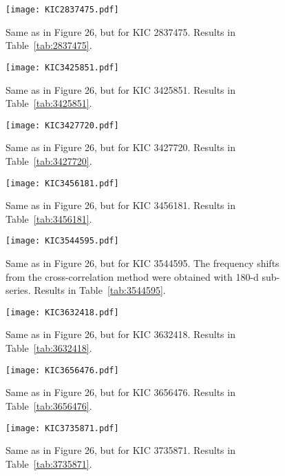 \documentclass[twocolumn]{aastex61}%
\begin{document}
\begin{figure}[ht]
\texttt{[image: KIC2837475.pdf]}
\caption{Same as in Figure 26, but for KIC 2837475. Results in Table~\ref{tab:2837475}.}\label{fig:2837475}
\end{figure}

\begin{figure}[ht]
\texttt{[image: KIC3425851.pdf]}
\caption{Same as in Figure 26, but for KIC 3425851. Results in Table~\ref{tab:3425851}.}\label{fig:3425851}
\end{figure}

\begin{figure}[ht]
\texttt{[image: KIC3427720.pdf]}
\caption{Same as in Figure 26, but for KIC 3427720. Results in Table~\ref{tab:3427720}.}\label{fig:3427720}
\end{figure}

\begin{figure}[ht]
\texttt{[image: KIC3456181.pdf]}\vspace{-0.3cm}
\caption{Same as in Figure 26, but for KIC 3456181. Results in Table~\ref{tab:3456181}.}\label{fig:3456181}\vspace{-0.2cm}
\end{figure}

\begin{figure}[ht]
\texttt{[image: KIC3544595.pdf]}\vspace{-0.3cm}
\caption{Same as in Figure 26, but for KIC 3544595. The frequency shifts from the cross-correlation method were obtained with 180-d sub-series. Results in Table~\ref{tab:3544595}.}\label{fig:3544595}\vspace{-1.2cm}
\end{figure}

\begin{figure}[ht]
\texttt{[image: KIC3632418.pdf]}
\caption{Same as in Figure 26, but for KIC 3632418. Results in Table~\ref{tab:3632418}.}\label{fig:3632418}
\end{figure}

\begin{figure}[ht]
\texttt{[image: KIC3656476.pdf]}
\caption{Same as in Figure 26, but for KIC 3656476. Results in Table~\ref{tab:3656476}.}\label{fig:3656476}
\end{figure}

\begin{figure}[ht]
\texttt{[image: KIC3735871.pdf]}
\caption{Same as in Figure 26, but for KIC 3735871. Results in Table~\ref{tab:3735871}.}\label{fig:3735871}
\end{figure}
\end{document}
